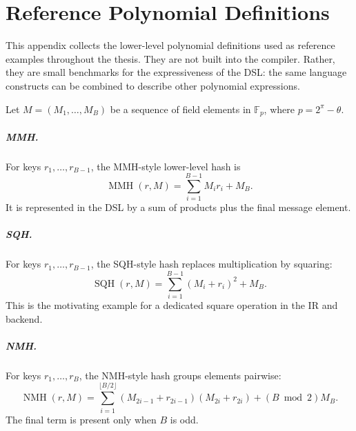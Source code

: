 \chapter{Reference Polynomial Definitions}
\label{app:polynomial-definitions}

This appendix collects the lower-level polynomial definitions used as reference examples throughout the thesis. They are not built into the compiler. Rather, they are small benchmarks for the expressiveness of the DSL: the same language constructs can be combined to describe other polynomial expressions.

Let \(M=(M_1,\ldots,M_B)\) be a sequence of field elements in \(\mathbb{F}_p\), where \(p=2^\pi-\theta\).

\paragraph{MMH.}
For keys \(r_1,\ldots,r_{B-1}\), the MMH-style lower-level hash is
\[
    \operatorname{MMH}(r,M)
      = \sum_{i=1}^{B-1} M_i r_i + M_B.
\]
It is represented in the DSL by a sum of products plus the final message element.

\paragraph{SQH.}
For keys \(r_1,\ldots,r_{B-1}\), the SQH-style hash replaces multiplication by squaring:
\[
    \operatorname{SQH}(r,M)
      = \sum_{i=1}^{B-1} (M_i+r_i)^2 + M_B.
\]
This is the motivating example for a dedicated square operation in the IR and backend.

\paragraph{NMH.}
For keys \(r_1,\ldots,r_B\), the NMH-style hash groups elements pairwise:
\[
    \operatorname{NMH}(r,M)
      =
      \sum_{i=1}^{\lfloor B/2 \rfloor}
        (M_{2i-1}+r_{2i-1})(M_{2i}+r_{2i})
      + (B \bmod 2)M_B.
\]
The final term is present only when \(B\) is odd.

